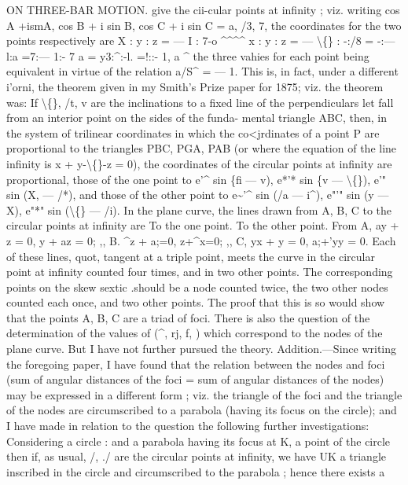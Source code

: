 \documentclass[12pt,a4paper]{article}
\begin{document}
ON THREE-BAR MOTION.
give the
cii-cular points at
infinity
;
viz. writing
cos A +ismA, cos B + i sin B,
cos C + i sin C = a,
/3,
7,
the coordinates
for the two points respectively are
X
: y
: z = --- I
:
7-o
\textasciicircum{}\textasciicircum{}\textasciicircum{}\textasciicircum{}
x
: y
:
z = --- \textbackslash\{\}
:
-:/8
=
-:--- l:a
=7:--- 1:-
7
a
=
y3:\textasciicircum{}:-l.
=!:\guillemotleft{}:- 1,
a
\textasciicircum{}
the
three
vahies
for
each
point
being
equivalent
in
virtue
of
the
relation
a/S\textasciicircum{} = --- 1.
This
is,
in
fact,
under
a
different
i'orni,
the
theorem
given
in
my
Smith's
Prize
paper
for
1875;
viz.
the
theorem
was:
If
\textbackslash\{\},
/t,
v
are
the
inclinations
to
a
fixed
line
of
the
perpendiculars
let
fall
from
an
interior
point
on
the
sides
of
the
funda-
mental
triangle
ABC,
then,
in
the
system
of
trilinear
coordinates
in
which
the
co<jrdinates
of
a
point P
are
proportional
to
the
triangles
PBC, PGA, PAB
(or
where
the
equation
of
the
line
infinity
is x + y-\textbackslash\{\}-z = 0),
the
coordinates of the
circular
points at
infinity
are
proportional,
those
of the
one
point
to
e'\textasciicircum{} sin \{fi --- v),
e*'* sin \{v --- \textbackslash\{\}),
e'" sin (X, --- /*), and
those of the other point
to
e\textasciitilde{}'\textasciicircum{} sin (/a --- i\textasciicircum{}),
e"'" sin (y --- X),
e"*" sin (\textbackslash\{\} --- /i).
In
the
plane
curve,
the
lines
drawn
from
A,
B, C
to
the
circular
points
at
infinity are
To the one
point.
To the other
point.
From A,
ay + z = 0,
y + az = 0;
,,
B.
\textasciicircum{}z + a;=0,
z+\textasciicircum{}x=0;
,,
C,
yx + y = 0,
a;+'yy = 0.
Each
of
these
lines,
quot,
tangent
at
a
triple
point,
meets
the
curve
in
the
circular
point
at
infinity
counted
four
times,
and
in
two
other
points.
The
corresponding
points
on
the
skew
sextic
.should
be
a
node
counted
twice,
the
two
other
nodes
counted
each
once,
and
two
other
points.
The
proof
that
this
is
so
would
show
that
the
points
A,
B, C
are
a
triad
of
foci.
There
is
also
the
question
of
the
determination
of
the
values
of
(\textasciicircum{},
rj,
f,
\guillemotleft{})
which
correspond
to
the
nodes
of
the
plane
curve.
But
I have not further pursued the
theory.
Addition.---Since
writing
the
foregoing
paper,
I
have
found
that
the
relation
between
the
nodes
and
foci
(sum
of angular
distances
of
the
foci = sum
of angular
distances
of
the
nodes)
may
be
expressed
in
a
different
form
;
viz.
the
triangle
of
the
foci
and
the
triangle
of
the
nodes
are
circumscribed
to
a
parabola
(having
its
focus
on
the
circle);
and
I
have
made
in
relation
to
the
question
the
following
further investigations:
Considering a
circle
:
and
a
parabola having
its
focus
at K, a
point
of the
circle
then
if,
as
usual,
/,
./
are
the
circular
points
at
infinity,
we
have UK
a
triangle
inscribed
in
the
circle
and
circumscribed
to
the
parabola
;
hence
there
exists
a
\end{document}
